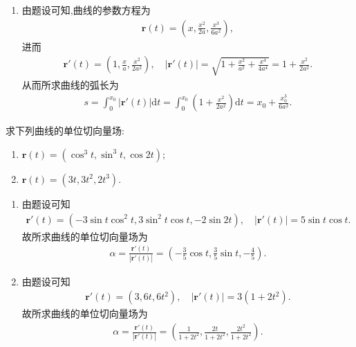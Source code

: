 \documentclass[../../main.tex]{subfiles}%
\begin{document}
\begin{solution}
\begin{enumerate}[(1)]
\item 由题设可知,曲线的参数方程为
\begin{align*}
\bm{r}(t)=\left(x,\frac{x^2}{2a},\frac{x^3}{6a^2}\right),
\end{align*}
进而
\begin{align*}
\bm{r}'(t)=\left(1,\frac{x}{a},\frac{x^2}{2a^2}\right),\quad |\bm{r}'(t)|=\sqrt{1+\frac{x^2}{a^2}+\frac{x^4}{4a^4}}=1+\frac{x^2}{2a^2}.
\end{align*}
从而所求曲线的弧长为
\begin{align*}
s=\int_0^{x_0} |\bm{r}'(t)|\mathrm{d}t=\int_0^{x_0} \left(1+\frac{x^2}{2a^2}\right)\mathrm{d}t=x_0+\frac{x_0^3}{6a^2}.
\end{align*}

\end{enumerate}

\end{solution}

\begin{example}
求下列曲线的单位切向量场:
\begin{enumerate}[(1)]
\item $\bm{r}(t) = (\cos^3 t, \sin^3 t, \cos 2t)$;
\item $\bm{r}(t) = (3t, 3t^2, 2t^3)$.
\end{enumerate}
\end{example}
\begin{solution}
\begin{enumerate}[(1)]
\item 由题设可知
\begin{align*}
\bm{r}'(t)=\left(-3\sin t\cos^2 t,3\sin^2 t\cos t,-2\sin 2t\right),\quad |\bm{r}'(t)|=5\sin t\cos t.
\end{align*}
故所求曲线的单位切向量场为
\begin{align*}
\alpha=\frac{\bm{r}'(t)}{|\bm{r}'(t)|}=\left(-\frac{3}{5}\cos t,\frac{3}{5}\sin t,-\frac{4}{5}\right).
\end{align*}
\item 由题设可知
\begin{align*}
\bm{r}'(t)=\left(3,6t,6t^2\right),\quad |\bm{r}'(t)|=3\left(1+2t^2\right).
\end{align*}
故所求曲线的单位切向量场为
\begin{align*}
\alpha=\frac{\bm{r}'(t)}{|\bm{r}'(t)|}=\left(\frac{1}{1+2t^2},\frac{2t}{1+2t^2},\frac{2t^2}{1+2t^2}\right).
\end{align*}

\end{enumerate}

\end{solution}
\end{document}
